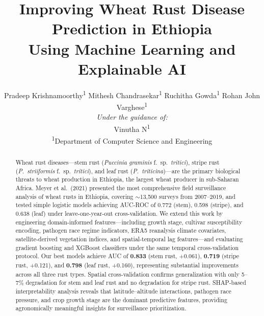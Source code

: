 \documentclass[10pt,twocolumn,letterpaper]{article}
\begin{document}
\title{Improving Wheat Rust Disease Prediction in Ethiopia\\Using Machine Learning and Explainable AI}

\author{
Pradeep Krishnamoorthy\textsuperscript{1} \quad
Mithesh Chandrasekar\textsuperscript{1} \quad
Ruchitha Gowda\textsuperscript{1} \quad
Rohan John Varghese\textsuperscript{1}\\[4pt]
\textit{Under the guidance of:}\\
Vinutha N\textsuperscript{1}\\[6pt]
\textsuperscript{1}Department of Computer Science and Engineering\\
}

\maketitle

\begin{abstract}
Wheat rust diseases---stem rust (\textit{Puccinia graminis} f.\ sp.\ \textit{tritici}), stripe rust (\textit{P.\ striiformis} f.\ sp.\ \textit{tritici}), and leaf rust (\textit{P.\ triticina})---are the primary biological threats to wheat production in Ethiopia, the largest wheat producer in sub-Saharan Africa. Meyer et al.\ (2021) presented the most comprehensive field surveillance analysis of wheat rusts in Ethiopia, covering ${\sim}$13,500 surveys from 2007--2019, and tested simple logistic models achieving AUC-ROC of 0.772 (stem), 0.598 (stripe), and 0.638 (leaf) under leave-one-year-out cross-validation. We extend this work by engineering domain-informed features---including growth stage, cultivar susceptibility encoding, pathogen race regime indicators, ERA5 reanalysis climate covariates, satellite-derived vegetation indices, and spatial-temporal lag features---and evaluating gradient boosting and XGBoost classifiers under the same temporal cross-validation protocol. Our best models achieve AUC of \textbf{0.833} (stem rust, +0.061), \textbf{0.719} (stripe rust, +0.121), and \textbf{0.798} (leaf rust, +0.160), representing substantial improvements across all three rust types. Spatial cross-validation confirms generalization with only 5--7\% degradation for stem and leaf rust and no degradation for stripe rust. SHAP-based interpretability analysis reveals that latitude--altitude interactions, pathogen race pressure, and crop growth stage are the dominant predictive features, providing agronomically meaningful insights for surveillance prioritization.
\end{abstract}
\end{document}

